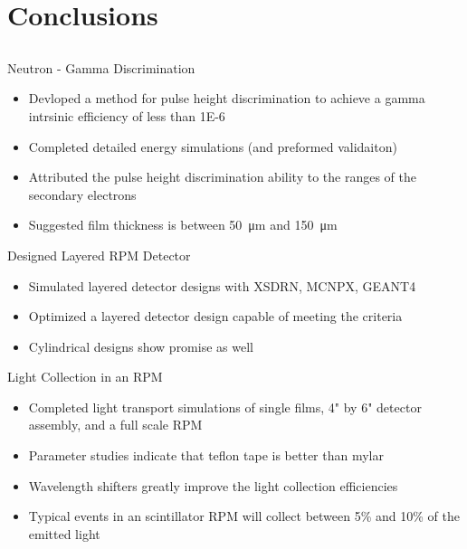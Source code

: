 \documentclass[compress]{beamer}
\begin{document}
\section{Conclusions}
\subsection*{}
\begin{frame}{Neutron - Gamma Discrimination}
  \begin{itemize}
    \item Devloped a method for pulse height discrimination to achieve a gamma intrsinic efficiency of less than \num{1E-6}
    \item Completed detailed energy simulations (and preformed validaiton)
    \item Attributed the pulse height discrimination ability to the ranges of the secondary electrons
    \item Suggested film thickness is between \SI{50}{\um} and \SI{150}{\um}
  \end{itemize}
\end{frame}
\begin{frame}{Designed Layered RPM Detector}
  \begin{itemize}
    \item Simulated layered detector designs with XSDRN, MCNPX, GEANT4
    \item Optimized a layered detector design capable of meeting the criteria
    \item Cylindrical designs show promise as well
  \end{itemize}
\end{frame}
\begin{frame}{Light Collection in an RPM}
  \begin{itemize}
    \item Completed light transport simulations of single films, 4" by 6" detector assembly, and a full scale RPM
    \item Parameter studies indicate that teflon tape is better than mylar
    \item Wavelength shifters greatly improve the light collection efficiencies
    \item Typical events in an scintillator RPM will collect between 5\% and 10\% of the emitted light
  \end{itemize}
\end{frame}
\end{document}
